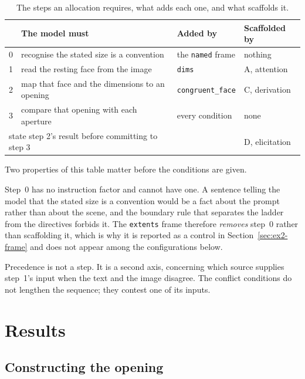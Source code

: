\begin{table}[h]
\caption{The steps an allocation requires, what adds each one, and what
scaffolds it.}
\label{tab:ex2-steps}
\centering
\begin{tabular}{clll}
\toprule
 & The model must & Added by & Scaffolded by \\
\midrule
0 & recognise the stated size is a convention & the \texttt{named} frame
  & nothing \\
1 & read the resting face from the image & \texttt{dims} & A, attention \\
2 & map that face and the dimensions to an opening
  & \texttt{congruent\_face} & C, derivation \\
3 & compare that opening with each aperture & every condition & none \\
\midrule
\multicolumn{2}{l}{state step 2's result before committing to step 3}
  & & D, elicitation \\
\bottomrule
\end{tabular}
\end{table}

Two properties of this table matter before the conditions are given.

Step~0 has no instruction factor and cannot have one. A sentence telling the
model that the stated size is a convention would be a fact about the prompt
rather than about the scene, and the boundary rule that separates the ladder
from the directives forbids it. The \texttt{extents} frame therefore
\emph{removes} step~0 rather than scaffolding it, which is why it is reported
as a control in Section~\ref{sec:ex2-frame} and does not appear among the
configurations below.

Precedence is not a step. It is a second axis, concerning which source supplies
step~1's input when the text and the image disagree. The conflict conditions do
not lengthen the sequence; they contest one of its inputs.

%


\section{Results}

\subsection{Constructing the opening}

